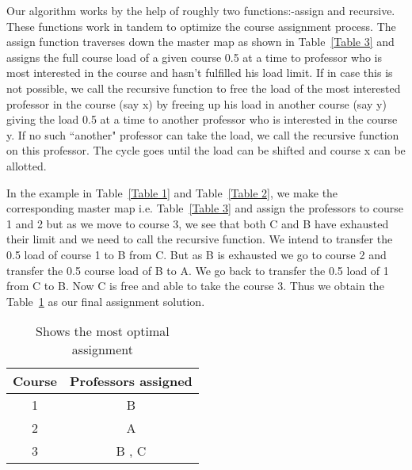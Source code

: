 \documentclass[12pt, letterpaper]{article}
\begin{document}
Our algorithm works by the help of roughly two functions:-assign and recursive. These functions work in tandem to optimize the course assignment process. The assign function traverses down the master map as shown in Table~\ref{Table 3} and assigns the full course load of a given course 0.5 at a time to professor who is most interested in the course and hasn't fulfilled his load limit. If in case this is not possible, we call the recursive function to free the load of the most interested professor in the course (say x) by freeing up his load in another course (say y) giving the load 0.5 at a time to another professor who is interested in the course y. If no such ``another" professor can take the load, we call the recursive function on this professor. The cycle goes until the load can be shifted and course x can be allotted.

In the example in Table~\ref{Table 1} and Table~\ref{Table 2}, we make the corresponding master map i.e. Table~\ref{Table 3} and assign the professors to course 1 and 2 but as we move to course 3, we see that both C and B have exhausted their limit and we need to call the recursive function. We intend to transfer the 0.5 load of course 1 to B from C. But as B is exhausted we go to course 2 and transfer the 0.5 course load of B to A. We go back to transfer the 0.5 load of 1 from C to B. Now C is free and able to take the course 3. Thus we obtain the Table~\ref{Table 4} as our final assignment solution.

\begin{table}[ht!]
\centering
\begin{tabular}{||c c ||} 
 \hline
 Course & Professors assigned \\ [0.5ex] 
 \hline\hline
 1 & B    \\ 
 2 & A   \\
 3 & B , C \\ [1ex] 
 \hline
\end{tabular}
\caption{Shows the most optimal assignment}
\label{Table 4}
\end{table}
\end{document}
